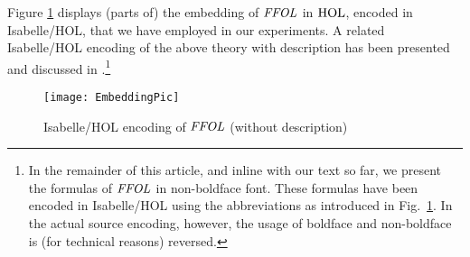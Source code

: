Figure \ref{pic1} displays (parts of) the embedding of $\mathit{FFOL}$ in
$\text{\textrm{HOL}}$, encoded in Isabelle/HOL, that we have employed in our
experiments. A related Isabelle/HOL encoding of the above theory with
description has been presented and discussed in
\cite{ICMS}.\footnote{In the remainder of this article, and inline
  with our text so far,  we present the formulas of
  $\mathit{FFOL}$ in non-boldface font. These formulas have been encoded in Isabelle/HOL using the
  abbreviations as introduced in Fig.~\ref{pic1}. In the actual source
  encoding, however, the usage of boldface and non-boldface is
  (for technical reasons) reversed.}

\begin{figure}[htp]
 \texttt{[image: EmbeddingPic]}
 \caption{Isabelle/HOL encoding of $\mathit{FFOL}$ (without description)\label{pic1}}
\end{figure}




